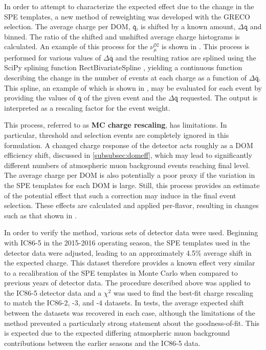 In order to attempt to characterize the expected effect due to the change in the SPE templates, a new method of reweighting was developed with the GRECO selection.
The average charge per DOM, $\mathtt{\bar{q}}$, is shifted by a known amount, $\mathtt{\Delta \bar{q}}$ and binned.
The ratio of the shifted and unshifted average charge histograms is calculated.
An example of this process for the $\mathtt{\nu_\mu^{CC}}$ is shown in .
This process is performed for various values of $\mathtt{\Delta \bar{q}}$ and the resulting ratios are splined using the SciPy splining function RectBivariateSpline , yielding a continuous function describing the change in the number of events at each charge as a function of $\mathtt{\Delta \bar{q}}$.
This spline, an example of which is shown in , may be evaluated for each event by providing the values of $\mathtt{\bar{q}}$ of the given event and the $\mathtt{\Delta \bar{q}}$ requested.
The output is interpreted as a rescaling factor for the event weight.

This process, referred to as \textbf{MC charge rescaling}, has limitations.
In particular, threshold and selection events are completely ignored in this formulation.
A changed charge response of the detector acts roughly as a DOM efficiency shift, discussed in \ref{subsubsec:domeff}, which may lead to significantly different numbers of atmospheric muon background events reaching final level.
The average charge per DOM is also potentially a poor proxy if the variation in the SPE templates for each DOM is large.
Still, this process provides an estimate of the potential effect that such a correction may induce in the final event selection.
These effects are calculated and applied per-flavor, resulting in changes such as that shown in .

In order to verify the method, various sets of detector data were used.
Beginning with IC86-5 in the 2015-2016 operating season, the SPE templates used in the detector data were adjusted, leading to an approximately 4.5\% average shift in the expected charge.
This dataset therefore provides a known effect very similar to a recalibration of the SPE templates in Monte Carlo when compared to previous years of detector data.
The procedure described above was applied to the IC86-5 detector data and a $\chi^2$ was used to find the best-fit charge rescaling to match the IC86-2, -3, and -4 datasets.
In tests, the average expected shift between the datasets was recovered in each case, although the limitations of the method prevented a particularly strong statement about the goodness-of-fit.
This is expected due to the expected differing atmospheric muon background contributions between the earlier seasons and the IC86-5 data.

